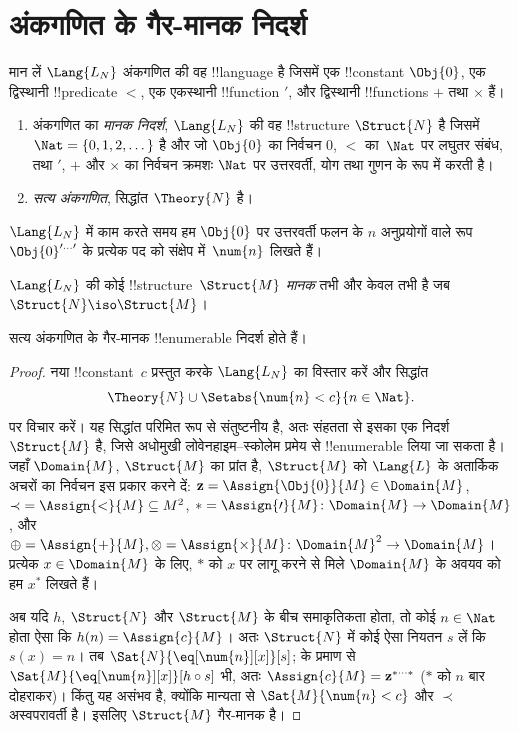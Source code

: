 \documentclass[../../../include/open-logic-section]{subfiles}
\begin{document}
\section{अंकगणित के गैर-मानक निदर्श}

\begin{defn}
मान लें $\Lang{L_N}$ अंकगणित की वह !!{language} है जिसमें एक !!{constant}
$\Obj{0}$, एक द्विस्थानी !!{predicate} $<$, एक एकस्थानी !!{function}
$\prime$, और द्विस्थानी !!{function}s $+$ तथा $\times$ हैं।
\begin{enumerate}
\item अंकगणित का \emph{मानक निदर्श}, $\Lang{L_N}$ की वह !!{structure}
  $\Struct{N}$ है जिसमें $\Nat = \{ 0, 1, 2, \dots\}$ है और जो $\Obj{0}$
  का निर्वचन $0$, $<$ का~$\Nat$ पर लघुतर संबंध, तथा $\prime$, $+$ और
  $\times$ का निर्वचन क्रमशः $\Nat$ पर उत्तरवर्ती, योग तथा गुणन के रूप में
  करती है।
\item \emph{सत्य अंकगणित}, सिद्धांत $\Theory{N}$ है।
\end{enumerate}
\end{defn}

$\Lang{L_N}$ में काम करते समय हम $\Obj{0}$ पर उत्तरवर्ती फलन के $n$
अनुप्रयोगों वाले रूप $\Obj{0}^{\prime\dots\prime}$ के प्रत्येक पद को
संक्षेप में~$\num{n}$ लिखते हैं।

\begin{defn}
$\Lang{L_N}$ की कोई !!{structure}~$\Struct{M}$ \emph{मानक} तभी और केवल तभी
है जब $\Struct{N} \iso \Struct{M}$।
\end{defn}

\begin{thm}
सत्य अंकगणित के गैर-मानक !!{enumerable} निदर्श होते हैं।
\end{thm}

\begin{proof}
नया !!{constant}~$c$ प्रस्तुत करके $\Lang{L_N}$ का विस्तार करें और सिद्धांत
\[
\Theory{N} \cup \Setabs{\num{n} < c}{n \in \Nat}.
\]
पर विचार करें। यह सिद्धांत परिमित रूप से संतुष्टनीय है, अतः संहतता से इसका
एक निदर्श $\Struct{M}$ है, जिसे अधोमुखी लोवेनहाइम--स्कोलेम प्रमेय से
!!{enumerable} लिया जा सकता है। जहाँ $\Domain{M}$, $\Struct{M}$ का प्रांत
है, $\Struct{M}$ को $\Lang{L}$ के अतार्किक अचरों का निर्वचन इस प्रकार करने
दें: $\mathbf{z} = \Assign{\Obj{0}}{M} \in \Domain{M}$, ${\prec} =
\Assign{<}{M} \subseteq M^2$, $* = \Assign{\prime}{M} \colon \Domain{M}
\to \Domain{M}$, और $\oplus = \Assign{+}{M}, \otimes =
\Assign{\times}{M} \colon \Domain{M}^2 \to \Domain{M}$। प्रत्येक $x \in
\Domain{M}$ के लिए, $*$ को $x$ पर लागू करने से मिले $\Domain{M}$ के अवयव को
हम $x^*$ लिखते हैं।

अब यदि $h$, $\Struct{N}$ और $\Struct{M}$ के बीच समाकृतिकता होता, तो कोई $n
\in \Nat$ होता ऐसा कि $h(n) = \Assign{c}{M}$। अतः $\Struct{N}$ में कोई
ऐसा नियतन $s$ लें कि $s(x) = n$। तब $\Sat{N}{\eq[\num{n}][x]}[s]$;
 के प्रमाण से $\Sat{M}{\eq[\num{n}][x]}[h \circ s]$
भी, अतः $\Assign{c}{M} = \mathbf{z}^{*\cdots *}$ ($*$ को $n$ बार दोहराकर)।
किंतु यह असंभव है, क्योंकि मान्यता से $\Sat{M}{\num{n} < c}$ और $\prec$
अस्वपरावर्ती है। इसलिए $\Struct{M}$ गैर-मानक है।
\end{proof}
\end{document}
